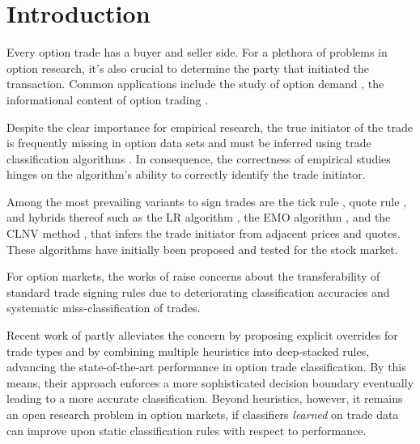 \section{Introduction}\label{sec:introduction}

Every option trade has a buyer and seller side. For a plethora of problems in option research, it’s also crucial to determine the party that initiated the transaction.  Common applications include the study of option demand \autocite[][3]{garleanuDemandBasedOptionPricing2009}, the informational content of option trading \autocites[][631]{huDoesOptionTrading2014}[][882]{panInformationOptionVolume2006} .

Despite the clear importance for empirical research, the true initiator of the trade is frequently missing in option data sets and must be inferred using trade classification algorithms \autocite[][453]{easleyOptionVolumeStock1998}. In consequence, the correctness of empirical studies hinges on the algorithm's ability to correctly identify the trade initiator.

Among the most prevailing variants to sign trades are the tick rule \autocite[][240]{hasbrouckTradesQuotesInventories1988}, quote rule \autocite[][41]{harrisDayEndTransactionPrice1989}, and hybrids thereof such as the \gls{LR} algorithm \autocite[][745]{leeInferringTradeDirection1991}, the \gls{EMO} algorithm \autocite[][536]{ellisAccuracyTradeClassification2000}, and the \gls{CLNV} method \autocite[][3809]{chakrabartyTradeClassificationAlgorithms2007}, that infers the trade initiator from adjacent prices and quotes. These algorithms have initially been proposed and tested for the stock market.

For option markets, the works of \textcites[][10--13]{grauerOptionTradeClassification2022}[][887]{savickasInferringDirectionOption2003} raise concerns about the transferability of standard trade signing rules due to deteriorating classification accuracies and systematic miss-classification of trades.  

Recent work of \textcite[][13--16]{grauerOptionTradeClassification2022} partly alleviates the concern by proposing explicit overrides for trade types and by combining multiple heuristics into deep-stacked rules, advancing the state-of-the-art performance in option trade classification. By this means, their approach enforces a more sophisticated decision boundary eventually leading to a more accurate classification. Beyond heuristics, however, it remains an open research problem in option markets, if classifiers \emph{learned} on trade data can improve upon static classification rules with respect to performance.


